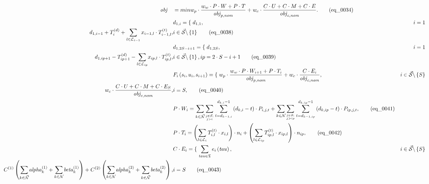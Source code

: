 \begin{align}
  \mathit{obj}\quad & = min w_{p} \cdot \frac{w_{w} \cdot P \cdot W + P \cdot T}{\mathit{obj}_{p , n o m}} + w_{c} \cdot \frac{C \cdot U + C \cdot M + C \cdot E}{\mathit{obj}_{c , n o m}} . \tag{eq\_0034} \\
  & d_{1 , i} = \left\{\right. d_{1 , 1} , & i = 1 \\ d_{1 , i - 1} + T_{i}^{\left(d\right)} + \sum_{l \in \mathcal{L}_{i - 1}} x_{i - 1 , l} \cdot T_{i - 1 , l}^{\left(t\right)} , & i \in \vec{\mathcal{S}} \backslash \left\{1\right\}  \tag{eq\_0038} \\
  & d_{1 , 2 S - i + 1} = \left\{\right. d_{1 , 2 S} , & i = 1 \\ d_{1 , ip + 1} - T_{ip + 1}^{\left(d\right)} - \underset{l \in \mathcal{L}_{ip}}{\sum} x_{ip , l} \cdot T_{ip , l}^{\left(t\right)} , & i \in \vec{\mathcal{S}} \backslash \left\{1\right\} , ip = 2 \cdot S - i + 1  \tag{eq\_0039} \\
  & F_{i} \left(s_{i} , u_{i} , s_{i + 1}\right) = \left\{\right. w_{p} \cdot \frac{w_{w} \cdot P \cdot W_{i + 1} + P \cdot T_{i}}{\mathit{obj}_{p , n o m}} + w_{c} \cdot \frac{C \cdot E_{i}}{\mathit{obj}_{c , n o m}} , & i \in \vec{\mathcal{S}} \backslash \left\{S\right\} \\ w_{c} \cdot \frac{C \cdot U + C \cdot M + C \cdot E_{S}}{\mathit{obj}_{c , n o m}} , & i = S , \tag{eq\_0040} \\
  & P \cdot W_{i} = \underset{k \in \vec{\mathcal{N}}}{\sum} \underset{\genfrac{}{}{0pt}{}{j \in \vec{\mathcal{S}} ;}{j > i}}{\sum} \sum_{t = d_{k - 1 , i}}^{d_{k , i} - 1} \left(d_{k , i} - t\right) \cdot P_{i , j , t} + \underset{k \in {\mathcal{N}}}{\sum} \underset{\genfrac{}{}{0pt}{}{j \in {\mathcal{S}} ;}{j > ip}}{\sum} \sum_{t = d_{k - 1 , ip}}^{d_{k , ip} - 1} \left(d_{k , ip} - t\right) \cdot P_{ip , j , t} , \tag{eq\_0041} \\
  &  P \cdot T_{i} = \left(\sum_{l \in \mathcal{L}_{i}} T_{i , l}^{\left(t\right)} \cdot x_{i , l}\right) \cdot n_{i} + \left(\underset{l \in \mathcal{L}_{ip}}{\sum} T_{ip , l}^{\left(t\right)} \cdot x_{ip , l}\right) \cdot n_{ip} ,  \tag{eq\_0042} \\
  & C \cdot E_{i} = \left\{\right. \sum_{\mathit{tau} \in \mathfrak{T}} e_{i} \left(\mathit{tau}\right) , & i \in \vec{\mathcal{S}} \backslash \left\{S\right\} \\ C^{\left(1\right)} \left(\underset{k \in \vec{\mathcal{N}}}{\sum} \mathit{alpha}_{k}^{\left(1\right)} + \underset{k \in {\mathcal{N}}}{\sum} \mathit{beta}_{k}^{\left(1\right)}\right) + C^{\left(2\right)} \left(\underset{k \in {\mathcal{N}}}{\sum} \mathit{alpha}_{k}^{\left(2\right)} + \underset{k \in \vec{\mathcal{N}}}{\sum} \mathit{beta}_{k}^{\left(2\right)}\right) , & i = S  \tag{eq\_0043} \\

\end{align}
